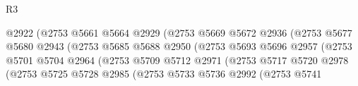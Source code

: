 \begin{lexlean}{R3}
\begin{coremodule}
                                            @2922
                                            (@2753
                                              @5661
                                              @5664
                                              @2929
                                              (@2753
                                                @5669
                                                @5672
                                                @2936
                                                (@2753
                                                  @5677
                                                  @5680
                                                  @2943
                                                  (@2753
                                                    @5685
                                                    @5688
                                                    @2950
                                                    (@2753
                                                      @5693
                                                      @5696
                                                      @2957
                                                      (@2753
                                                        @5701
                                                        @5704
                                                        @2964
                                                        (@2753
                                                          @5709
                                                          @5712
                                                          @2971
                                                          (@2753
                                                            @5717
                                                            @5720
                                                            @2978
                                                            (@2753
                                                              @5725
                                                              @5728
                                                              @2985
                                                              (@2753
                                                                @5733
                                                                @5736
                                                                @2992
                                                                (@2753
                                                                  @5741

\end{coremodule}
\end{lexlean}
